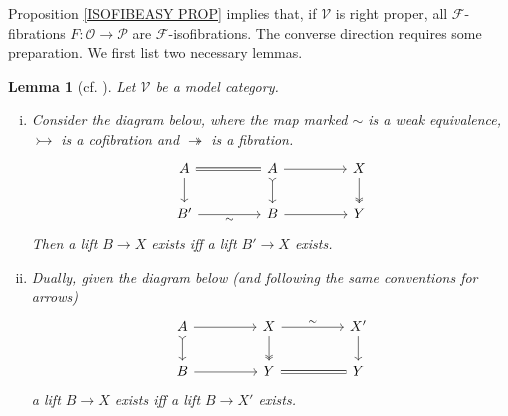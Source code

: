 \documentclass[a4paper,10pt
 ,final
]{article}%
\numberwithin{equation}{section}
\numberwithin{figure}{section}
\newtheorem{lemma}[equation]{Lemma}%
\theoremstyle{definition} %
\newcommand{\F}{\ensuremath{\mathcal F}}
\newcommand{\V}{\ensuremath{\mathcal V}}
\newcommand{\1}{\ensuremath{\mathbbm 1}}%
\begin{document}
Proposition \ref{ISOFIBEASY PROP}
implies that, if $\V$ is right proper,
all $\F$-fibrations $F \colon \mathcal{O} \to \mathcal{P}$ are $\F$-isofibrations.
%
The converse direction
requires some preparation.
We first list two necessary lemmas.



\begin{lemma}[{cf. \cite[Lemma 2.6]{Ber07b}}]
	\label{TRANSFLIFT LEMMA}
	Let $\V$ be a model category.
        \begin{enumerate}[(i)]
        \item Consider the diagram below, 
                where the map marked $\sim$ is a weak equivalence, 
                $\rightarrowtail$ is a cofibration
                and $\twoheadrightarrow$ is a fibration.
                \begin{equation}\label{TRANSFLIFT EQ}
                        \begin{tikzcd}[column sep = 45pt]
                                A
                                \ar{d}
                                \arrow[equal]{r}
                                &
                                A \ar{r}
                                \arrow[rightarrowtail]{d}
                                &
                                X \arrow[twoheadrightarrow]{d}
                                \\
                                B'
                                \arrow{r}[swap]{\sim}
                                &
                                B\ar{r}
                                &
                                Y
                        \end{tikzcd}
                \end{equation}
                Then a lift $B \to X$ %
                exists iff
                a lift $B' \to X$ %
                exists.
        \item Dually, given the diagram below (and following the same conventions for arrows)
                \begin{equation}
                        \label{TRANSLIFTDUAL EQ}
                        \begin{tikzcd}[column sep = 45pt]
                                A \arrow[r] \arrow[d, rightarrowtail]
                                &
                                X \arrow[r, "\sim"] \arrow[d, twoheadrightarrow]
                                &
                                X' \arrow[d]
                                \\
                                B \arrow[r]
                                &
                                Y \arrow[r, equal]
                                &
                                Y
                        \end{tikzcd}
                \end{equation}
                a lift $B \to X$ exists iff a lift $B \to X'$ exists.
        \end{enumerate}
\end{lemma}
\end{document}
